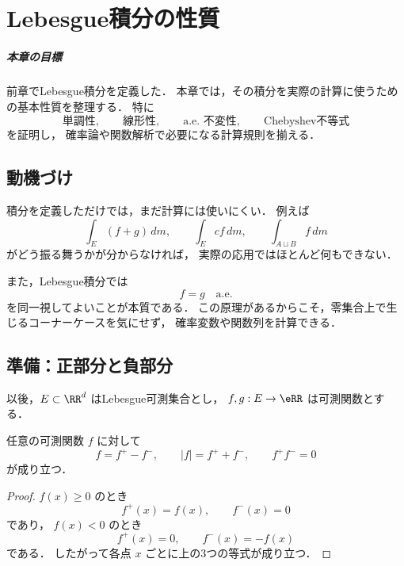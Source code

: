 \chapter{Lebesgue積分の性質}

\paragraph{本章の目標}
前章でLebesgue積分を定義した．
本章では，その積分を実際の計算に使うための基本性質を整理する．
特に
\[
\text{単調性},\qquad \text{線形性},\qquad \text{a.e.\ 不変性},\qquad \text{Chebyshev不等式}
\]
を証明し，
確率論や関数解析で必要になる計算規則を揃える．

\section{動機づけ}

積分を定義しただけでは，まだ計算には使いにくい．
例えば
\[
\int_E(f+g)\,dm,\qquad
\int_E cf\,dm,\qquad
\int_{A\sqcup B}f\,dm
\]
がどう振る舞うかが分からなければ，
実際の応用ではほとんど何もできない．

また，Lebesgue積分では
\[
f=g \quad \text{a.e.}
\]
を同一視してよいことが本質である．
この原理があるからこそ，零集合上で生じるコーナーケースを気にせず，
確率変数や関数列を計算できる．

\section{準備：正部分と負部分}

以後，$E \subset \RR^d$ はLebesgue可測集合とし，
$f,g:E \to \eRR$ は可測関数とする．

\begin{proposition}[基本恒等式]
任意の可測関数 $f$ に対して
\[
f=f^+-f^-,
\qquad
|f|=f^++f^-,
\qquad
f^+f^-=0
\]
が成り立つ．
\end{proposition}
\begin{proof}
$f(x)\ge 0$ のとき
\[
f^+(x)=f(x),\qquad f^-(x)=0
\]
であり，
$f(x)<0$ のとき
\[
f^+(x)=0,\qquad f^-(x)=-f(x)
\]
である．
したがって各点 $x$ ごとに上の3つの等式が成り立つ．
\end{proof}

